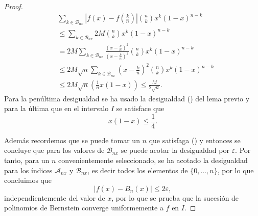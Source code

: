 \begin{proof}
    \begin{align*}
        &\sum_{k \in \mathcal{B}_{n x} } \left|f(x) - f \left( \frac{k}{n} \right)\right|
     \binom{n}{k} x^{k} (1-x)^{n-k}
     \\
     & 
     \leq 
      \sum_{k \in \mathcal{B}_{n x}} 2M 
    \binom{n}{k} x^{k} (1-x)^{n-k}
    \\ 
    & 
    = 2M \sum_{k \in \mathcal{B}_{n x}} 
    \frac{
        \left(x- \frac{k}{n}\right)^2
    }{
        \left(x- \frac{k}{n}\right)^2
    }
    \binom{n}{k} x^{k} (1-x)^{n-k}
    \\
    &
    \leq 2M 
    \sqrt{n}
    \sum_{k \in \mathcal{B}_{n x}} 
    \left(x- \frac{k}{n}\right)^2
    \binom{n}{k} x^{k} (1-x)^{n-k}
    \\
    & %
    \leq
    2M \sqrt{n}
    \left(
        \frac{1}{n} x(1-x)
    \right)
    \leq 
    \frac{M}{2 \sqrt{n}}.
    \end{align*}
    Para la penúltima desigualdad se ha usado 
    la desigualdad () del lema previo y para la última que en el intervalo $I$ se satisface que 
    \begin{equation*}
        x (1-x) \leq \frac{1}{4}.
    \end{equation*}

    Además recordemos que se puede tomar un  $n$ que satisfaga () y entonces se concluye que para los valores de
    $\mathcal{B}_{n x}$ se puede acotar la desigualdad por $\varepsilon$. 
    Por tanto, para un $n$ convenientemente seleccionado, se ha acotado la desigualdad para los  índices $\mathcal{A}_{n x}$ y $\mathcal{B}_{n x}$, es decir todos los elementos de $\{0, \ldots, n\}$, por lo que concluimos que 
    \begin{equation*}
        |f(x) - B_n(x)| \leq 2 \varepsilon,
    \end{equation*}
    independientemente del valor de $x$, por lo que se prueba que la sucesión de polinomios de Bernstein converge uniformemente a $f$ en $I$.
\end{proof}